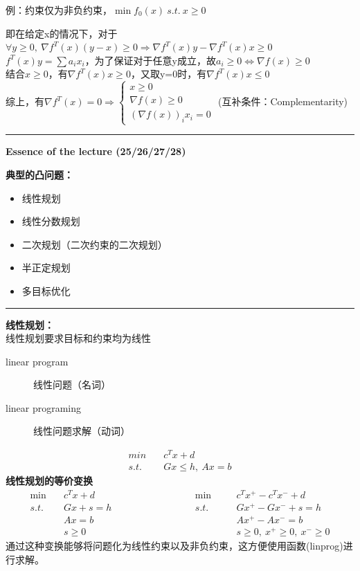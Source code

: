 \documentclass[11pt]{ctexart}         %
\newcommand{\rebacklinespread}[1][-12pt]{\vspace{#1}}
\newcommand{\oneline}[1][12pt]{\vspace{#1}}
\newcommand{\bc}[1]{\begin{cases}#1\end{cases}}
\newcommand{\li}[3][例]{
	#1：#2\\ 
	\phantom{#1：}\begin{minipage}[t]{0.9\linewidth}%
	\setlength\parskip{12pt}
	#3
	\end{minipage}
	\oneline}
\newcommand{\paint}[2][red]{{\color{#1}#2}} %
\begin{document}
\newpage
\li{约束仅为非负约束，$ \min f_0(x)\ s.t.\ x\geq 0 $}{
	即在给定x的情况下，对于$ \forall y \geq 0,\ \nabla f^T(x)(y-x)\geq 0\Rightarrow \nabla f^T(x)y-\nabla f^T(x)x\geq 0$\\
	$ f^T(x)y=\sum a_i x_i $，为了保证对于任意y成立，故$ a_i\geq 0\Leftrightarrow \nabla f(x)\geq 0 $\\
	结合$ x\geq 0 $，有\paint[blue]{$ \nabla f^T(x)x\geq 0 $}，又取y=0时，有\paint[blue]{$ \nabla f^T(x)x\leq 0 $}\\ [6pt]
	综上，有$ \nabla f^T(x)= 0 \Rightarrow\bc{x\geq 0\\ \nabla f(x)\geq 0\\ (\nabla f(x))_ix_i=0}$ \paint{(互补条件：Complementarity)}
}

\newpage
\hrule height 4pt
\begin{Large}
	\textbf{Essence of the lecture (25/26/27/28)}\\
\end{Large}
\begin{large}
	\textbf{典型的凸问题：} 
\end{large}
\vspace{-16pt}
\begin{itemize} \setlength{\itemsep}{0pt}
	\item 线性规划
	\item 线性分数规划
	\item 二次规划（二次约束的二次规划）
	\item 半正定规划
	\item 多目标优化
\end{itemize}
\hrule height 4pt
\textbf{线性规划：}\\
线性规划要求目标和约束均为线性
\rebacklinespread
\begin{description}
	\item[linear program] 线性问题（名词）
	\item[linear programing] 线性问题求解（动词）
\end{description}
\vspace{-24pt}
\begin{align*}
	min\quad &c^Tx+d\\
	s.t.\quad &Gx\leq h,\ Ax=b
\end{align*}
\textbf{线性规划的等价变换}
\rebacklinespread
\begin{alignat*}{4}
	\min\quad&c^Tx+d&&\hspace{7em}\min\quad &&c^Tx^+-c^Tx^-+d\\
	s.t.\quad&Gx+s=h&&\hspace{7em}s.t.\quad &&Gx^+-Gx^-+s=h\\
			 &Ax=b	&&			&&Ax^+-Ax^-=b\\
			 &s\geq 0&&			&&s\geq 0,\ x^+\geq 0,\ x^-\geq 0
\end{alignat*}
\paint{通过这种变换能够将问题化为线性约束以及非负约束，这方便使用函数(linprog)进行求解。}
\end{document}
